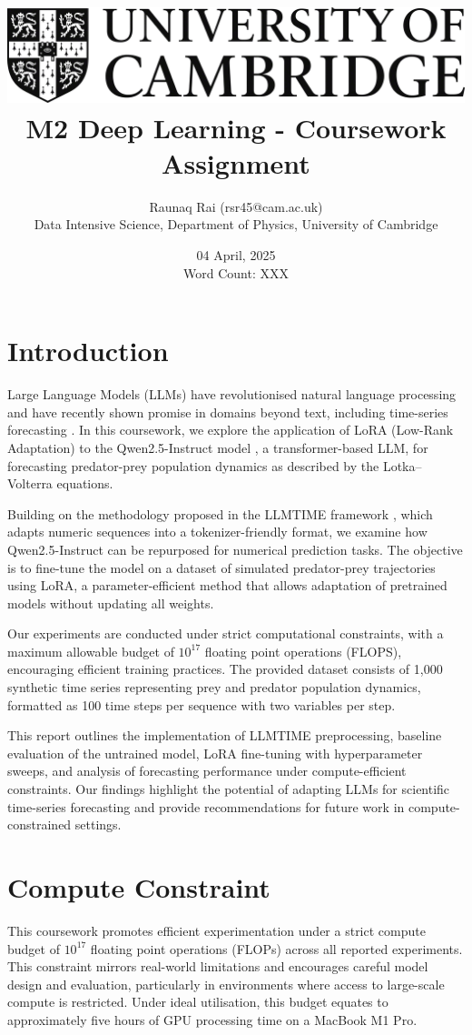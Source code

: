 \documentclass[a4paper,12pt]{article}
\title{
    \includegraphics[scale=0.4]{Cam_logo_bw.png}\\
    \vspace{0.5cm}
    M2 Deep Learning - Coursework Assignment
}
\author{Raunaq Rai (rsr45@cam.ac.uk)\\
    Data Intensive Science, Department of Physics, University of Cambridge
}
\date{04 April, 2025 \\ \vspace{0.2cm} {\small Word Count: XXX}}
\begin{document}
\maketitle

\section*{Introduction}

Large Language Models (LLMs) have revolutionised natural language processing and have recently shown promise in domains beyond text, including time-series forecasting \citep{gruver2023language}. In this coursework, we explore the application of LoRA (Low-Rank Adaptation) \citep{hu2021lora} to the Qwen2.5-Instruct model \citep{qwen2.5}, a transformer-based LLM, for forecasting predator-prey population dynamics as described by the Lotka–Volterra equations.

Building on the methodology proposed in the LLMTIME framework \citep{gruver2023language}, which adapts numeric sequences into a tokenizer-friendly format, we examine how Qwen2.5-Instruct can be repurposed for numerical prediction tasks. The objective is to fine-tune the model on a dataset of simulated predator-prey trajectories using LoRA, a parameter-efficient method that allows adaptation of pretrained models without updating all weights.

Our experiments are conducted under strict computational constraints, with a maximum allowable budget of $10^{17}$ floating point operations (FLOPS), encouraging efficient training practices. The provided dataset consists of 1,000 synthetic time series representing prey and predator population dynamics, formatted as 100 time steps per sequence with two variables per step.

This report outlines the implementation of LLMTIME preprocessing, baseline evaluation of the untrained model, LoRA fine-tuning with hyperparameter sweeps, and analysis of forecasting performance under compute-efficient constraints. Our findings highlight the potential of adapting LLMs for scientific time-series forecasting and provide recommendations for future work in compute-constrained settings.

\section{Compute Constraint}

This coursework promotes efficient experimentation under a strict compute budget of $10^{17}$ floating point operations (FLOPs) across all reported experiments. This constraint mirrors real-world limitations and encourages careful model design and evaluation, particularly in environments where access to large-scale compute is restricted. Under ideal utilisation, this budget equates to approximately five hours of GPU processing time on a MacBook M1 Pro.
\end{document}
